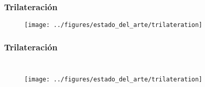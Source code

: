 \documentclass[mathserif]{beamer}
\begin{document}

\begin{frame}
\frametitle{Trilateración}

\begin{figure}
\texttt{[image: ../figures/estado\_del\_arte/trilateration]}
\end{figure}

\end{frame}



\begin{frame}
\frametitle{Trilateración}

\begin{columns}[t] %



\vspace*{.15\textwidth}

\begin{figure}
\texttt{[image: ../figures/estado\_del\_arte/trilateration]}
\end{figure}

\end{columns}

\end{frame}

\end{document}
